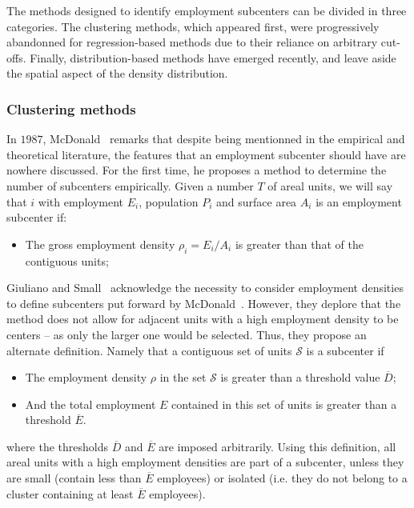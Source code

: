 The methods designed to identify employment subcenters can be divided in three
categories. The clustering methods, which appeared first, were progressively
abandonned for regression-based methods due to their reliance on arbitrary
cut-offs. Finally, distribution-based methods have emerged recently, and leave
aside the spatial aspect of the density distribution.


\subsubsection{Clustering methods}
\label{ssub:clustering_methods}


In $1987$, McDonald~\cite{McDonald:1987} remarks that despite being mentionned
in the empirical and theoretical literature, the features that an employment
subcenter should have are nowhere discussed. For the first time, he proposes a method to
determine the number of subcenters empirically. Given
a number $T$ of areal units, we will say that $i$ with employment $E_i$,
population $P_i$ and surface area $A_i$ is an employment subcenter if:

\begin{itemize}
    \item The gross employment density $\rho_i = E_i/A_i$ is greater than that
        of the contiguous units;
\end{itemize}

Giuliano and Small~\cite{Giuliano:1991} acknowledge the necessity to
consider employment densities to define subcenters put forward by
McDonald~\cite{McDonald:1987}. However, they deplore that the method does not
allow for adjacent units with a high employment density to be centers -- as only
the larger one would be selected. Thus, they propose an alternate definition.
Namely that a contiguous set of units $\mathcal{S}$ is a subcenter if 

\begin{itemize}
    \item The employment density $\rho$ in the set $\mathcal{S}$ is greater than
        a threshold value  $\overline{D}$;
    \item And the total employment $E$ contained in this set of units is greater than a threshold
        $\overline{E}$.
\end{itemize}

where the thresholds $\overline{D}$ and $\overline{E}$ are imposed arbitrarily.
Using this definition, all areal units with a high employment densities are part
of a subcenter, unless they are small (contain less than $\overline{E}$
employees) or isolated (i.e. they do not belong to a cluster containing at
least $\overline{E}$ employees).


